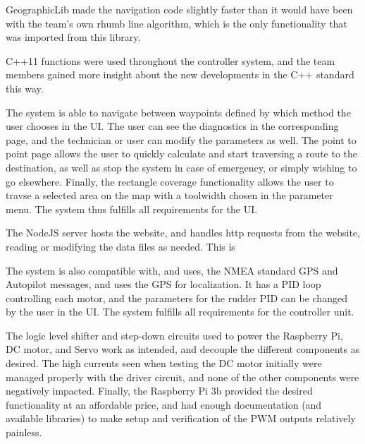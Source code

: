 GeographicLib made the navigation code slightly faster than it would have been with the team's own rhumb line algorithm, which is the only functionality that was imported from this library. 

C++11 functions were used throughout the controller system, and the team members gained more insight about the new developments in the C++ standard this way.

The system is able to navigate between waypoints defined by which method the user chooses in the UI. The user can see the diagnostics in the corresponding page, and the technician or user can modify the parameters as well. The point to point page allows the user to quickly calculate and start traversing a route to the destination, as well as stop the system in case of emergency, or simply wishing to go elsewhere. Finally, the rectangle coverage functionality allows the user to travse a selected area on the map with a toolwidth chosen in the parameter menu. The system thus fulfills all requirements for the UI. 

The NodeJS server hosts the website, and handles http requests from the website, reading or modifying the data files as needed. This is  

The system is also compatible with, and uses, the NMEA standard GPS and Autopilot messages, and uses the GPS for localization. It has a PID loop controlling each motor, and the parameters for the rudder PID can be changed by the user in the UI. The system fulfills all requirements for the controller unit. 

The logic level shifter and step-down circuits used to power the Raspberry Pi, DC motor, and Servo work as intended, and decouple the different components as desired. The high currents seen when testing the DC motor initially were managed properly with the driver circuit, and none of the other components were negatively impacted. Finally, the Raspberry Pi 3b provided the desired functionality at an affordable price, and had enough documentation (and available libraries) to make setup and verification of the PWM outputs relatively painless. 